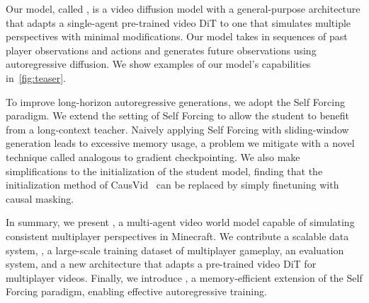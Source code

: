 Our model, called \solaris, is a video diffusion model with a general-purpose architecture that adapts a single-agent pre-trained video DiT to one that simulates multiple perspectives with minimal modifications. Our model takes in sequences of past player observations and actions and generates future observations using autoregressive diffusion. We show examples of our model's capabilities in~\cref{fig:teaser}.

To improve long-horizon autoregressive generations, we adopt the Self Forcing~\cite{huang2025selfforcingbridgingtraintest} paradigm. We extend the setting of Self Forcing to allow the student to benefit from a long-context teacher. Naively applying Self Forcing with sliding-window generation leads to excessive memory usage, a problem we mitigate with a novel technique called \oursf analogous to gradient checkpointing. We also make simplifications to the initialization of the student model, finding that the initialization method of CausVid~\cite{yin2025slowbidirectionalfastautoregressive} can be replaced by simply finetuning with causal masking. 

In summary, we present \solaris, a multi-agent video world model capable of simulating consistent multiplayer perspectives in Minecraft. We contribute a scalable data system, \solarisengine, a large-scale training dataset of multiplayer gameplay, an evaluation system, and a new architecture that adapts a pre-trained video DiT for multiplayer videos. Finally, we introduce \oursf, a memory-efficient extension of the Self Forcing paradigm, enabling effective autoregressive training.









